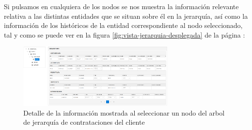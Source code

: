 Si pulsamos en cualquiera de los nodos se nos muestra la información relevante relativa a las distintas entidades que se situan sobre él en la jerarquía, así como la información de los históricos de la entidad correspondiente al nodo seleccionado, tal y como se puede ver en la figura \ref{fig:vista-jerarquia-desplegada} de la página \pageref{fig:vista-jerarquia-desplegada}:


\begin{figure}[H]
  \centering
  \includegraphics[width=0.70\textwidth]{imaxes/vista-jearquia-informacion-nodo.png}
  \caption{Detalle de la información mostrada al seleccionar un nodo del arbol de jerarquía de contrataciones del cliente}
  \label{fig:vista-jearquia-informacion-nodo}
\end{figure}